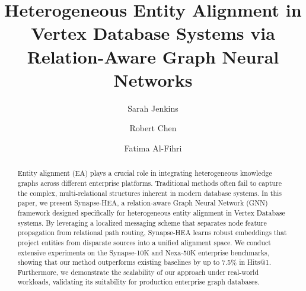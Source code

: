 \documentclass[sigconf,anonymous,review]{acmart}
\begin{document}
\title{Heterogeneous Entity Alignment in Vertex Database Systems via Relation-Aware Graph
Neural Networks}

\author{Sarah Jenkins}

\author{Robert Chen}

\author{Fatima Al-Fihri}

\renewcommand{\shortauthors}{Jenkins et al.}

\begin{abstract}
Entity alignment (EA) plays a crucial role in integrating heterogeneous knowledge graphs
across different enterprise platforms. Traditional methods often fail to capture the
complex, multi-relational structures inherent in modern database systems. In this paper, we
present Synapse-HEA, a relation-aware Graph Neural Network (GNN) framework designed
specifically for heterogeneous entity alignment in Vertex Database systems. By leveraging a
localized messaging scheme that separates node feature propagation from relational path
routing, Synapse-HEA learns robust embeddings that project entities from disparate sources
into a unified alignment space. We conduct extensive experiments on the Synapse-10K and
Nexa-50K enterprise benchmarks, showing that our method outperforms existing baselines by up
to 7.5\% in Hits@1. Furthermore, we demonstrate the scalability of our approach under
real-world workloads, validating its suitability for production enterprise graph databases.
\end{abstract}



\maketitle

\noindent{}











\end{document}
